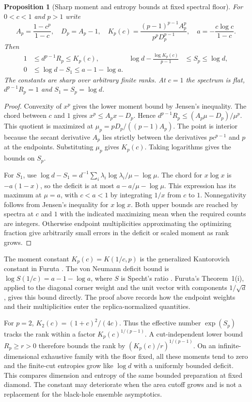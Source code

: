 \documentclass[11pt]{article}
\newtheorem{prop}{Proposition}
\begin{document}
\begin{prop}[Sharp moment and entropy bounds at fixed spectral floor]\label{prop:renyi}
For $0<c<1$ and $p>1$ write
\[
 A_p=\frac{1-c^p}{1-c},\quad D_p=A_p-1,\quad
 K_p(c)=\frac{(p-1)^{p-1} A_p^p}{p^p D_p^{p-1}},\quad
 a=-\frac{c\log c}{1-c}.
\]
Then
\begin{align}
 1&\le d^{p-1}R_p\le K_p(c),&
 \log d-\frac{\log K_p(c)}{p-1}&\le S_p\le\log d,\label{eq:renyi-sharp}\\
 0&\le\log d-S_1\le a-1-\log a.\label{eq:entropy-floor}
\end{align}
The constants are sharp over arbitrary finite ranks. At $c=1$ the spectrum is flat, $d^{p-1}R_p=1$ and $S_1=S_p=\log d$.
\end{prop}
\begin{proof}
Convexity of $x^p$ gives the lower moment bound by Jensen's inequality. The chord between $c$ and $1$ gives $x^p\le A_p x-D_p$. Hence $d^{p-1}R_p\le(A_p\mu-D_p)/\mu^p$. This quotient is maximized at $\mu_p=pD_p/((p-1)A_p)$. The point is interior because the secant derivative $A_p$ lies strictly between the derivatives $pc^{p-1}$ and $p$ at the endpoints. Substituting $\mu_p$ gives $K_p(c)$. Taking logarithms gives the bounds on $S_p$. 

For $S_1$, use $\log d-S_1=d^{-1}\sum_i\lambda_i\log\lambda_i/\mu-\log\mu$. The chord for $x\log x$ is $-a(1-x)$, so the deficit is at most $a-a/\mu-\log\mu$. This expression has its maximum at $\mu=a$, with $c<a<1$ by integrating $1/x$ from $c$ to $1$. Nonnegativity follows from Jensen's inequality for $x\log x$. Both upper bounds are reached by spectra at $c$ and $1$ with the indicated maximizing mean when the required counts are integers. Otherwise endpoint multiplicities approximating the optimizing fraction give arbitrarily small errors in the deficit or scaled moment as rank grows.
\end{proof}

The moment constant $K_p(c)=K(1/c,p)$ is the generalized Kantorovich constant in Furuta \cite[Eq.~(1.2) and Theorem A]{furuta}. The von Neumann deficit bound is $\log S(1/c)=a-1-\log a$, where $S$ is Specht's ratio \cite{specht,furuta}. Furuta's Theorem~1(i), applied to the diagonal corner weight and the unit vector with components $1/\sqrt d$, gives this bound directly. The proof above records how the endpoint weights and their multiplicities enter the replica-normalized quantities.

For $p=2$, $K_2(c)=(1+c)^2/(4c)$. Thus the effective number $\exp(S_p)$ tracks the rank within a factor $K_p(c)^{1/(p-1)}$. A cut-independent lower bound $R_p\ge r>0$ therefore bounds the rank by $(K_p(c)/r)^{1/(p-1)}$. On an infinite-dimensional exhaustive family with the floor fixed, all these moments tend to zero and the finite-cut entropies grow like $\log d$ with a uniformly bounded deficit. This compares dimension and entropy of the same bounded preparation at fixed diamond. The constant may deteriorate when the area cutoff grows and is not a replacement for the black-hole ensemble asymptotics.
\end{document}
